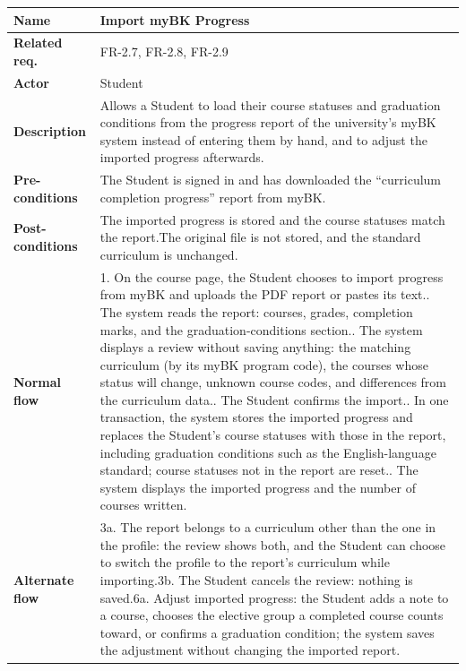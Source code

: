 \begin{longtable}{|p{}|p{}|}
\hline
\textbf{Name} & Import myBK Progress \\
\hline
\textbf{Related req.} & FR-2.7, FR-2.8, FR-2.9 \\
\hline
\textbf{Actor} & Student \\
\hline
\textbf{Description} & Allows a Student to load their course statuses and graduation conditions from the progress report of the university's myBK system instead of entering them by hand, and to adjust the imported progress afterwards. \\
\hline
\textbf{Pre-conditions} & The Student is signed in and has downloaded the ``curriculum completion progress'' report from myBK. \\
\hline
\textbf{Post-conditions} & The imported progress is stored and the course statuses match the report.\newline The original file is not stored, and the standard curriculum is unchanged. \\
\hline
\textbf{Normal flow} & 1. On the course page, the Student chooses to import progress from myBK and uploads the PDF report or pastes its text.\newline 2. The system reads the report: courses, grades, completion marks, and the graduation-conditions section.\newline 3. The system displays a review without saving anything: the matching curriculum (by its myBK program code), the courses whose status will change, unknown course codes, and differences from the curriculum data.\newline 4. The Student confirms the import.\newline 5. In one transaction, the system stores the imported progress and replaces the Student's course statuses with those in the report, including graduation conditions such as the English-language standard; course statuses not in the report are reset.\newline 6. The system displays the imported progress and the number of courses written. \\
\hline
\textbf{Alternate flow} & 3a. The report belongs to a curriculum other than the one in the profile: the review shows both, and the Student can choose to switch the profile to the report's curriculum while importing.\newline 3b. The Student cancels the review: nothing is saved.\newline 6a. Adjust imported progress: the Student adds a note to a course, chooses the elective group a completed course counts toward, or confirms a graduation condition; the system saves the adjustment without changing the imported report. \\

\end{longtable}
